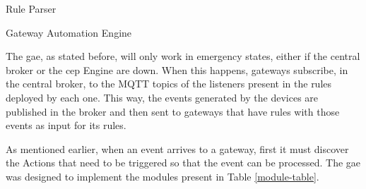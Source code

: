 \begin{Paragraph}{Rule Parser}
\end{Paragraph}

\begin{Paragraph}{Gateway Automation Engine}

The \acf{gae}, as stated before, will only work in emergency states, either if the central broker or the \ac{cep} Engine are down. When this happens, gateways subscribe, in the central broker, to the MQTT topics of the listeners present in the rules deployed by each one. This way, the events generated by the devices are published in the broker and then sent to gateways that have rules with those events as input for its rules. 

As mentioned earlier, when an event arrives to a gateway, first it must discover the Actions that need to be triggered so that the event can be processed. The \ac{gae} was designed to implement the modules present in Table \ref{module-table}.
 
\begin{table}[H]


\end{table}
\end{Paragraph}
